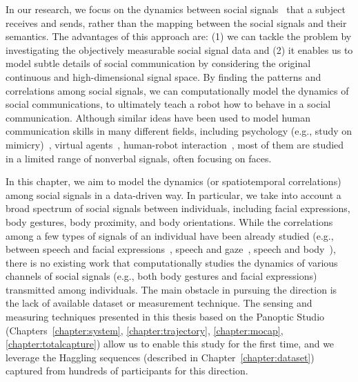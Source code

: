 In our research, we focus on the dynamics between social signals~\cite{pentland2004social} that a subject receives and sends, rather than the mapping between the social signals and their semantics. The advantages of this approach are: (1) we can tackle the problem by investigating the objectively measurable social signal data and (2) it enables us to model subtle details of social communication by considering the original continuous and high-dimensional signal space. By finding the patterns and correlations among social signals, we can computationally model the dynamics of social communications, to ultimately teach a robot how to behave in a social communication. Although similar ideas have been used to model human communication skills in many different fields, including psychology (e.g., study on mimicry)~\cite{bernieri1988synchrony}, virtual agents~\cite{morency2008predicting,morency2010modeling}, human-robot interaction~\cite{huang2014learning}, most of them are studied in a limited range of nonverbal signals, often focusing on faces. 

In this chapter, we aim to model the dynamics (or spatiotemporal correlations) among social signals in a data-driven way. In particular, we take into account a broad spectrum of social signals between individuals, including facial expressions, body gestures, body proximity, and body orientations. While the correlations among a few types of signals of an individual have been already studied (e.g., between speech and facial expressions~\cite{kendon1980gesticulation, mcneill1992hand}, speech and gaze~\cite{griffin2001gaze}, speech and body~\cite{levine2010gesture,marsella2013virtual}), there is no existing work that computationally studies the dynamics of various channels of social signals (e.g., both body gestures and facial expressions) transmitted among individuals. The main obstacle in pursuing the direction is the lack of available dataset or measurement technique. The sensing and measuring techniques presented in this thesis based on the Panoptic Studio (Chapters~\ref{chapter:system}, \ref{chapter:trajectory}, \ref{chapter:mocap}, \ref{chapter:totalcapture}) allow us to enable this study for the first time, and we leverage the Haggling sequences (described in Chapter~\ref{chapter:dataset}) captured from hundreds of participants for this direction.

